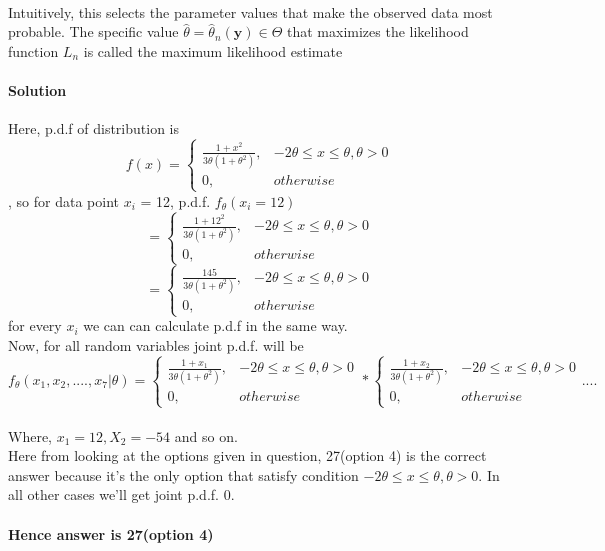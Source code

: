\documentclass{article}
\begin{document}
\paragraph{}
Intuitively, this selects the parameter values that make the observed data most probable. The specific value \({\hat {\theta }}={\hat {\theta }}_{n}(\mathbf {y} )\in \Theta \) that maximizes the likelihood function \( L_{n}\) is called the maximum likelihood estimate
\paragraph{Solution}
Here, p.d.f of distribution is \[
    f(x)= 
\begin{cases}
\frac{1 + x^2}{3\theta(1+\theta^2)},& -2\theta \leq x \leq \theta, \theta > 0\\
    0,              & otherwise
\end{cases}
\], so for data point \(x_i\) = 12, p.d.f. \(f_\theta(x_i = 12)\)  \[= \begin{cases}
\frac{1 + 12^2}{3\theta(1+\theta^2)},& -2\theta \leq x \leq \theta, \theta > 0\\
    0,              & otherwise
\end{cases}
\]
\[= \begin{cases}
\frac{145}{3\theta(1+\theta^2)},& -2\theta \leq x \leq \theta, \theta > 0\\
    0,              & otherwise
\end{cases}
\] 
for every \(x_i\) we can can calculate p.d.f in the same way. \\
Now, for all random variables joint p.d.f. will be 
\[f_\theta(x_1,x_2,....,x_7 | \theta)= \begin{cases}
\frac{1 + x_1}{3\theta(1+\theta^2)},& -2\theta \leq x \leq \theta, \theta > 0\\
    0,              & otherwise
\end{cases} * \begin{cases}
\frac{1 + x_2}{3\theta(1+\theta^2)},& -2\theta \leq x \leq \theta, \theta > 0\\
    0,              & otherwise
\end{cases} ....
\] 
\\ 
Where, \(x_1 = 12, X_2 = -54\) and so on.
\\ Here from looking at the options given in question, 27(option 4) is the correct answer because it's the only option that satisfy condition \(-2\theta \leq x \leq \theta , \theta > 0\). In all other cases we'll get joint p.d.f. 0.
\\\paragraph{}
\textbf{Hence answer is 27(option 4)}
\end{document}
